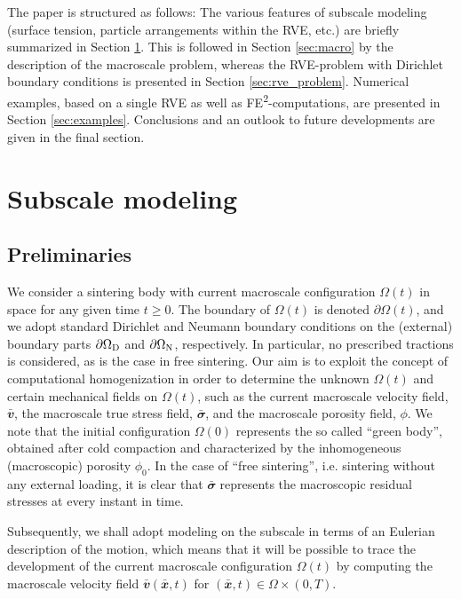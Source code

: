\documentclass[12pt,a4paper,fleqn]{article}
\renewcommand{\ta}[1]{\mathbfit{#1}}
\renewcommand{\ts}[1]{\mathbfit{#1}}
\newcommand{\figref}[1]{Figure~\ref{#1}}
\newcommand{\pore}{\mathrm{pore}}
\newcommand{\particle}{\mathrm{part}}
\newcommand{\contact}{\mathrm{cont}}
\begin{document}
The paper is structured as follows:
The various features of subscale modeling (surface tension, particle arrangements within the RVE, etc.) are briefly summarized in Section \ref{sec:subscale}.
This is followed in Section \ref{sec:macro} by the description of the macroscale problem, whereas the RVE-problem with Dirichlet boundary conditions is presented in Section \ref{sec:rve_problem}.
Numerical examples, based on a single RVE as well as FE\textsuperscript{2}-computations, are presented in Section \ref{sec:examples}. Conclusions and an outlook to future developments are given in the final section.


\section{Subscale modeling}\label{sec:subscale}

\subsection{Preliminaries}

We consider a sintering body with current macroscale configuration $\Omega(t)$ in space for any given time $t\geq 0$. The boundary of $\Omega(t)$ is denoted $\partial\Omega(t)$, and we adopt standard Dirichlet and Neumann boundary conditions on the (external) boundary parts $\partial\Omega_{\mathrm{D}}$ and $\partial\Omega_{\mathrm{N}}$, respectively.
In particular, no prescribed tractions is considered, as is the case in free sintering.
Our aim is to exploit the concept of computational homogenization in order to determine the unknown $\Omega(t)$ and certain mechanical fields on $\Omega(t)$, such as the current macroscale velocity field, $\bar{\ts v}$, the macroscale true stress field, $\bar{\ts\sigma}$, and the macroscale porosity field, $\phi$.
We note that the initial configuration $\Omega(0)$ represents the so called ``green body'', obtained after cold compaction and characterized by the inhomogeneous (macroscopic) porosity $\phi_0$.
In the case of ``free sintering'', i.e. sintering without any external loading, it is clear that $\bar{\ts\sigma}$ represents the macroscopic residual stresses at every instant in time.

Subsequently, we shall adopt modeling on the subscale in terms of an Eulerian description of the motion, which means that it will be possible to trace the development of the current macroscale configuration $\Omega(t)$ by computing the macroscale velocity field $\bar{\ta v}(\bar{\ta x},t)$ for $(\bar{\ta x},t)\in\Omega\times(0,T)$.
\end{document}
